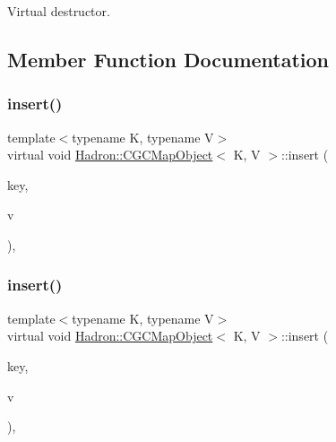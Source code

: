 Virtual destructor. 



\subsection{Member Function Documentation}
\mbox{\label{classHadron_1_1CGCMapObject_a334a88a21755a64719b1081190d2bde2}} 
\subsubsection{\texorpdfstring{insert()}{insert()}\hspace{0.1cm}{\footnotesize\ttfamily [1/3]}}
{\footnotesize\ttfamily template$<$typename K, typename V$>$ \\
virtual void \mbox{\hyperlink{classHadron_1_1CGCMapObject}{Hadron\+::\+C\+G\+C\+Map\+Object}}$<$ K, V $>$\+::insert (\begin{DoxyParamCaption}\item[{const \mbox{\hyperlink{structHadron_1_1CGCKeyType}{C\+G\+C\+Key\+Type}}$<$ K $>$ \&}]{key,  }\item[{const V \&}]{v }\end{DoxyParamCaption})\hspace{0.3cm}{\ttfamily [inline]}, {\ttfamily [virtual]}}

\mbox{\label{classHadron_1_1CGCMapObject_a334a88a21755a64719b1081190d2bde2}} 
\subsubsection{\texorpdfstring{insert()}{insert()}\hspace{0.1cm}{\footnotesize\ttfamily [2/3]}}
{\footnotesize\ttfamily template$<$typename K, typename V$>$ \\
virtual void \mbox{\hyperlink{classHadron_1_1CGCMapObject}{Hadron\+::\+C\+G\+C\+Map\+Object}}$<$ K, V $>$\+::insert (\begin{DoxyParamCaption}\item[{const \mbox{\hyperlink{structHadron_1_1CGCKeyType}{C\+G\+C\+Key\+Type}}$<$ K $>$ \&}]{key,  }\item[{const V \&}]{v }\end{DoxyParamCaption})\hspace{0.3cm}{\ttfamily [inline]}, {\ttfamily [virtual]}}

